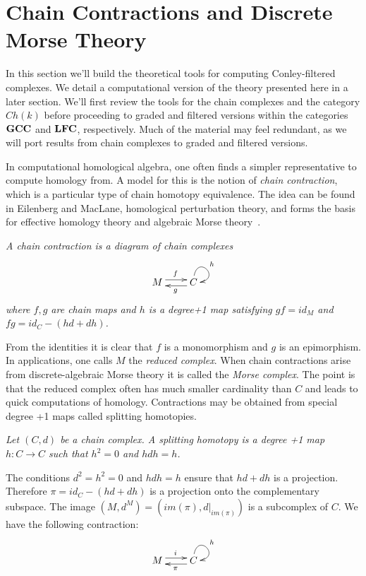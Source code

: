 

\section{Chain Contractions and Discrete Morse Theory}\label{sec:contractions}

In this section we'll build the theoretical tools for computing Conley-filtered complexes.   We detail a computational version of the theory presented here in a later section.  We'll first review the tools for the chain complexes and the category $Ch(k)$ before proceeding to graded and filtered versions within the categories ${\bf GCC}$ and ${\bf LFC}$, respectively.  Much of the material may feel redundant, as we will port results from chain complexes to graded and filtered versions.


  In computational homological algebra, one often finds a simpler representative to compute homology from.  A model for this is the notion of {\em chain contraction}, which is a particular type of chain homotopy equivalence.  The idea can be found in Eilenberg and MacLane, homological perturbation theory, and forms the basis for effective homology theory and algebraic Morse theory~\cite{}.

\begin{defn}
{\em A {\em chain contraction} is a diagram of chain complexes
\[
\xymatrixrowsep{0.03in}
\xymatrixcolsep{0.3in}
\xymatrix{
M  \ar[r]<3pt>^{f} & \ar[l]<3pt>^{g} C \ar@(u,r)^{h}
}
\]
where $f,g$ are chain maps and $h$ is a degree+1 map satisfying $gf = id_M$ and $fg = id_C-(hd+dh)$.
}
\end{defn}

From the identities it is clear that $f$ is a monomorphism and $g$ is an epimorphism.  In applications, one calls $M$ the {\em reduced complex}.  When chain contractions arise from discrete-algebraic Morse theory it is called the {\em Morse complex}.  The point is that the reduced complex often has much smaller cardinality than $C$ and leads to quick computations of homology.  Contractions may be obtained from special degree +1 maps called splitting homotopies.

\begin{defn}
{\em
Let $(C,d)$ be a chain complex.  A {\em splitting homotopy} is a degree +1 map $h:C\to C$ such that $h^2=0$ and $h dh = h$.
}
\end{defn}

The conditions $d^2=h^2=0$ and $hdh = h$ ensure that $hd+dh$ is a projection.  Therefore $\pi=id_C-(hd+dh)$ is a projection onto the complementary subspace.  The image $(M,d^M)=(im(\pi),d|_{im(\pi)})$ is a subcomplex of $C$.  We have the following contraction:
\[
\xymatrixrowsep{0.03in}
\xymatrixcolsep{0.3in}
\xymatrix{
M  \ar[r]<3pt>^{i} & \ar[l]<3pt>^{\pi} C \ar@(u,r)^{h}
}
\]

